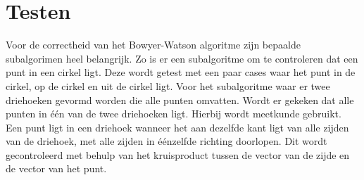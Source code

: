 \section{Testen}
Voor de correctheid van het Bowyer-Watson algoritme zijn bepaalde subalgorimen heel belangrijk. Zo is er een subalgoritme om te controleren dat een punt in een cirkel ligt. Deze wordt getest met een paar cases waar het punt in de cirkel, op de cirkel en uit de cirkel ligt.
Voor het subalgoritme waar er twee driehoeken gevormd worden die alle punten omvatten. Wordt er gekeken dat alle punten in één van de twee driehoeken ligt. Hierbij wordt meetkunde gebruikt. Een punt ligt in een driehoek wanneer het aan dezelfde kant ligt van alle zijden van de driehoek, met alle zijden in éénzelfde richting doorlopen. Dit wordt gecontroleerd met behulp van het kruisproduct tussen de vector van de zijde en de vector van het punt. \cite{toepMeetkunde}